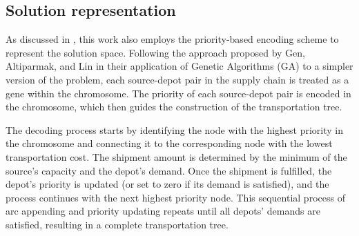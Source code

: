\documentclass[sn-nature]{sn-jnl}%
\theoremstyle{thmstyleone}%
\theoremstyle{thmstyletwo}%
\theoremstyle{thmstylethree}%
\begin{document}

\subsection{Solution representation}
As discussed in \cite{rajabi2023utilizing}, this work also employs the priority-based encoding scheme to represent the solution space. Following the approach proposed by Gen, Altiparmak, and Lin \cite{gen2006genetic} in their application of Genetic Algorithms (GA) to a simpler version of the problem, each source-depot pair in the supply chain is treated as a gene within the chromosome. The priority of each source-depot pair is encoded in the chromosome, which then guides the construction of the transportation tree.

The decoding process starts by identifying the node with the highest priority in the chromosome and connecting it to the corresponding node with the lowest transportation cost. The shipment amount is determined by the minimum of the source's capacity and the depot's demand. Once the shipment is fulfilled, the depot's priority is updated (or set to zero if its demand is satisfied), and the process continues with the next highest priority node. This sequential process of arc appending and priority updating repeats until all depots' demands are satisfied, resulting in a complete transportation tree.
\end{document}
